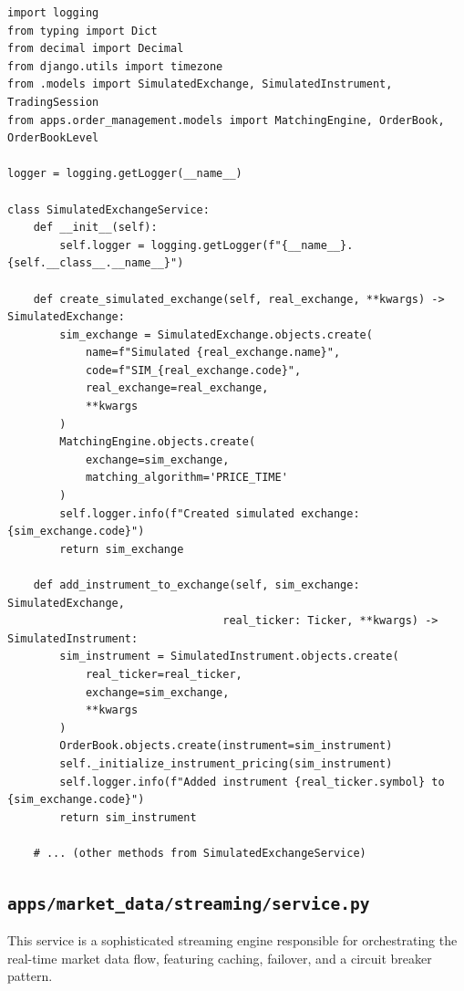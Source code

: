 \documentclass[12pt]{article}
\begin{document}
\begin{verbatim}
import logging
from typing import Dict
from decimal import Decimal
from django.utils import timezone
from .models import SimulatedExchange, SimulatedInstrument, TradingSession
from apps.order_management.models import MatchingEngine, OrderBook, OrderBookLevel

logger = logging.getLogger(__name__)

class SimulatedExchangeService:
    def __init__(self):
        self.logger = logging.getLogger(f"{__name__}.{self.__class__.__name__}")

    def create_simulated_exchange(self, real_exchange, **kwargs) -> SimulatedExchange:
        sim_exchange = SimulatedExchange.objects.create(
            name=f"Simulated {real_exchange.name}",
            code=f"SIM_{real_exchange.code}",
            real_exchange=real_exchange,
            **kwargs
        )
        MatchingEngine.objects.create(
            exchange=sim_exchange,
            matching_algorithm='PRICE_TIME'
        )
        self.logger.info(f"Created simulated exchange: {sim_exchange.code}")
        return sim_exchange

    def add_instrument_to_exchange(self, sim_exchange: SimulatedExchange,
                                 real_ticker: Ticker, **kwargs) -> SimulatedInstrument:
        sim_instrument = SimulatedInstrument.objects.create(
            real_ticker=real_ticker,
            exchange=sim_exchange,
            **kwargs
        )
        OrderBook.objects.create(instrument=sim_instrument)
        self._initialize_instrument_pricing(sim_instrument)
        self.logger.info(f"Added instrument {real_ticker.symbol} to {sim_exchange.code}")
        return sim_instrument
    
    # ... (other methods from SimulatedExchangeService)
\end{verbatim}

\subsection{\texttt{apps/market\_data/streaming/service.py}}

This service is a sophisticated streaming engine responsible for orchestrating the real-time market data flow, featuring caching, failover, and a circuit breaker pattern.
\end{document}
